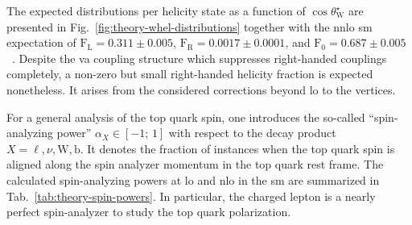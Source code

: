 The expected distributions per helicity state as a function of $\cos\theta^\star_\mathrm{W}$ are presented in Fig.~\ref{fig:theory-whel-distributions} together with the \gls{nnlo} \gls{sm} expectation of $\mathrm{F}_\mathrm{L}=0.311\pm0.005$, $\mathrm{F}_\mathrm{R}=0.0017\pm0.0001$, and $\mathrm{F}_{0}=0.687\pm0.005$~\cite{Czarnecki:2010gb}. Despite the \gls{va} coupling structure which suppresses right-handed couplings completely, a non-zero but small right-handed helicity fraction is expected nonetheless. It arises from the considered corrections beyond \gls{lo} to the vertices.


For a general analysis of the top quark spin, one introduces the so-called ``spin-analyzing power'' $\alpha_{X}\in[-1;\,1]$ with respect to the decay product $X=\ell,\nu,\mathrm{W},\mathrm{b}$. It denotes the fraction of instances when the top quark spin is aligned along the spin analyzer momentum in the top quark rest frame. The calculated spin-analyzing powers at \gls{lo} and \gls{nlo} in the \gls{sm} are summarized in Tab.~\ref{tab:theory-spin-powers}. In particular, the charged lepton is a nearly perfect spin-analyzer to study the top quark polarization.


